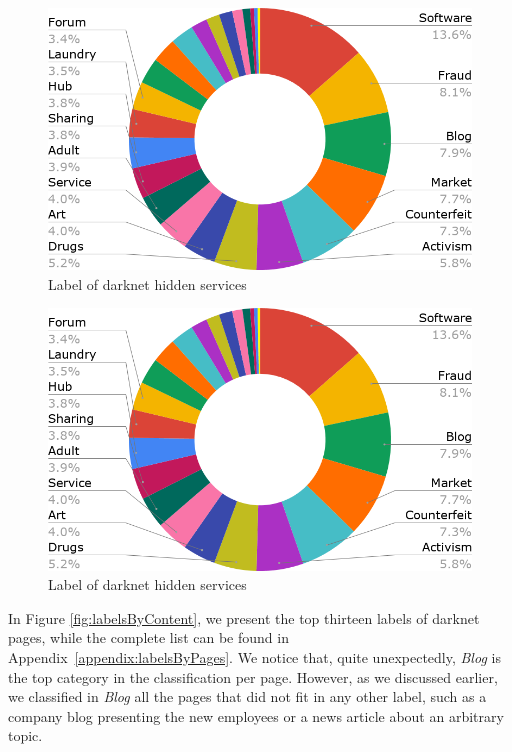 \ifdgruyter
  \begin{figure}[h]
  \includegraphics[width=\linewidth]{images/labelsByHost.png}
  \caption{Label of darknet hidden services}
  \label{fig:labelsByHost}
  \end{figure}
\fi

\iflncs
  \begin{figure}[h]
  \centering
  \includegraphics[width=0.6\linewidth]{images/labelsByHost.png}
  \caption{Label of darknet hidden services}
  \label{fig:labelsByHost}
  \end{figure}
\fi
\newpage
In Figure \ref{fig:labelsByContent}, we present the top thirteen labels of darknet pages, while the complete list can be found in Appendix~\ref{appendix:labelsByPages}. 
We notice that, quite unexpectedly, \emph{Blog} is the top category in the classification per page. However, as we discussed earlier, we classified in \emph{Blog} all the pages that did not fit in any other label, such as a company blog presenting the new employees or a news article about an arbitrary topic.

